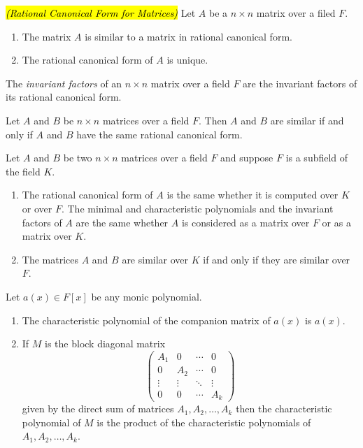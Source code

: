 \nl

\begin{thm}\hl{\textit{(Rational Canonical Form for Matrices)}}
Let $A$ be a $n\times n$ matrix over a filed $F$.
\begin{enumerate}
\item The matrix $A$ is similar to a matrix in rational canonical form.
\item The rational canonical form of $A$ is unique.
\end{enumerate}
\end{thm}

\nl

\begin{defn}
The \textit{invariant factors} of an $n\times n$ matrix over a field $F$ are the invariant factors of its rational canonical form.
\end{defn}

\nl

\begin{thm}
Let $A$ and $B$ be $n\times n$ matrices over a field $F$. Then $A$ and $B$ are similar if and only if $A$ and $B$ have the same rational canonical form.
\end{thm}

\nl

\begin{cor}
Let $A$ and $B$ be two $n\times n$ matrices over a field $F$ and suppose $F$ is a subfield of the field $K$.
\begin{enumerate}
\item The rational canonical form of $A$ is the same whether it is computed over $K$ or over $F$. The minimal and characteristic polynomials and the invariant factors of $A$ are the same whether $A$ is considered as a matrix over $F$ or as a matrix over $K$.
\item The matrices $A$ and $B$ are similar over $K$ if and only if they are similar over $F$.
\end{enumerate}
\end{cor}

\nl

\begin{lem}
Let $a(x)\in F[x]$ be any monic polynomial.
\begin{enumerate}
\item The characteristic polynomial of the companion matrix of $a(x)$ is $a(x)$.
\item If $M$ is the block diagonal matrix
\[\begin{pmatrix}
A_1 & 0 & \cdots & 0\\
0 & A_2 & \cdots & 0\\
\vdots & \vdots & \ddots & \vdots\\
0 & 0 & \cdots & A_k
\end{pmatrix}\]
given by the direct sum of matrices $A_1, A_2, \ldots, A_k$ then the characteristic polynomial of $M$ is the product of the characteristic polynomials of $A_1, A_2, \ldots, A_k$.
\end{enumerate}
\end{lem}

